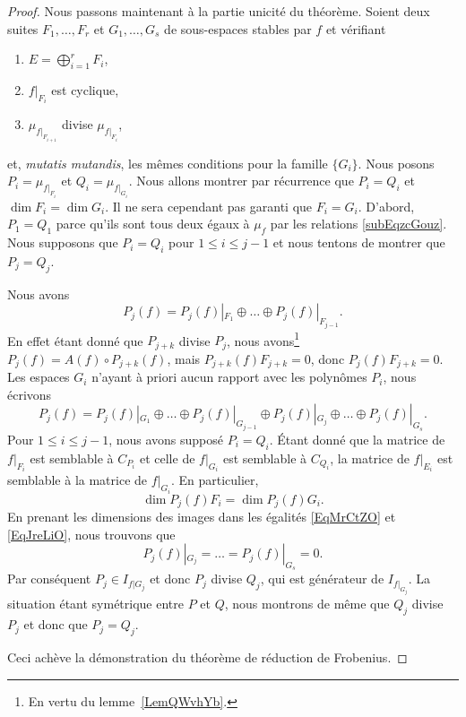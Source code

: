 \begin{proof}
	Nous passons maintenant à la partie unicité du théorème. Soient deux suites \( F_1,\ldots, F_r\) et \( G_1,\ldots, G_s\) de sous-espaces stables par \( f\) et vérifiant
	\begin{enumerate}
		\item
		      \( E=\bigoplus_{i=1}^rF_i\),
		\item
		      \( f|_{F_i}\) est cyclique,
		\item
		      \( \mu_{f|_{F_{i+1}}}\) divise \( \mu_{f|_{F_i}}\),
	\end{enumerate}
	et, \emph{mutatis mutandis}, les mêmes conditions pour la famille \( \{ G_i \}\). Nous posons \( P_i=\mu_{f|_{F_i}}\) et \( Q_i=\mu_{f|_{G_i}}\). Nous allons montrer par récurrence que \( P_i=Q_i\) et \( \dim F_i=\dim G_i\). Il ne sera cependant pas garanti que \( F_i=G_i\). D'abord, \( P_1=Q_1\) parce qu'ils sont tous deux égaux à \( \mu_f\) par les relations \eqref{subEqzcGouz}. Nous supposons que \( P_i=Q_i\) pour \( 1\leq i\leq j-1\) et nous tentons de montrer que \( P_j=Q_j\).

	Nous avons
	\begin{equation}    \label{EqMrCtZO}
		P_j(f)=P_j(f)|_{F_1}\oplus\ldots\oplus P_j(f)|_{F_{j-1}}.
	\end{equation}
	En effet étant donné que \( P_{j+k}\) divise \( P_j\), nous avons\footnote{En vertu du lemme~\ref{LemQWvhYb}.} \( P_{j}(f)=A(f)\circ P_{j+k}(f)\), mais \( P_{j+k}(f)F_{j+k}=0\), donc \( P_j(f)F_{j+k}=0\). Les espaces \( G_i\) n'ayant à priori aucun rapport avec les polynômes \( P_i\), nous écrivons
	\begin{equation}    \label{EqJreLiO}
		P_j(f)=P_j(f)|_{G_1}\oplus\ldots\oplus P_j(f)|_{G_{j-1}}\oplus P_j(f)|_{G_j}\oplus\ldots\oplus P_j(f)|_{G_s}.
	\end{equation}
	Pour \( 1\leq i\leq j-1\), nous avons supposé \( P_i=Q_i\). Étant donné que la matrice de \( f|_{F_i}\) est semblable à \( C_{P_i}\) et celle de \( f|_{G_i}\) est semblable à \( C_{Q_i}\), la matrice de \( f|_{E_i}\) est semblable à la matrice de \( f|_{G_i}\). En particulier,
	\begin{equation}
		\dim P_j(f)F_i=\dim P_j(f)G_i.
	\end{equation}
	En prenant les dimensions des images dans les égalités \eqref{EqMrCtZO} et \eqref{EqJreLiO}, nous trouvons que
	\begin{equation}
		P_j(f)|_{G_j}=\ldots=P_j(f)|_{G_s}=0.
	\end{equation}
	Par conséquent \( P_j\in I_{f|G_j}\) et donc \( P_j\) divise \( Q_j\), qui est générateur de \( I_{f|_{G_j}}\). La situation étant symétrique entre \( P\) et \( Q\), nous montrons de même que \( Q_j\) divise \( P_j\) et donc que \( P_j=Q_j\).

	Ceci achève la démonstration du théorème de réduction de Frobenius.

\end{proof}

